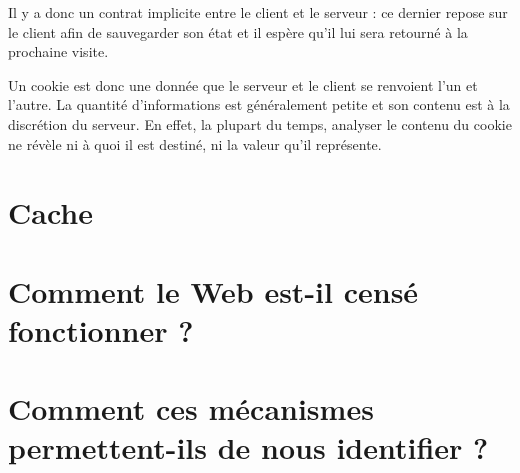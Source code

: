 Il y a donc un contrat implicite entre le client et le serveur : ce dernier repose sur le client afin de sauvegarder son état et il espère qu'il lui sera retourné à la prochaine visite.

Un cookie est donc une donnée que le serveur et le client se renvoient l'un et l'autre. La quantité d'informations est généralement petite et son contenu est à la discrétion du serveur. En effet, la plupart du temps, analyser le contenu du cookie ne révèle ni à quoi il est destiné, ni la valeur qu'il représente.

\section{Cache}

\section{Comment le Web est-il censé fonctionner ?}

\section{Comment ces mécanismes permettent-ils de nous identifier ?}